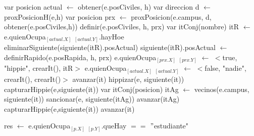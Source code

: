 \begin{algorithm}[H]
\begin{algorithmic}[1]
 
	\State var posicion actual $\gets$ obtener(e.posCiviles, h) 
	\State var direccion d $\gets$ proxPosicionH(e,h) 
	\State var posicion prx $\gets$ proxPosicion(e.campus, d, obtener(e.posCiviles,h)) 
	\State definir(e.posCiviles, h, prx) 
	\State var itConj(nombre) itR $\gets$ e.quienOcupa$_{[actual.X]}$ $_{[actual.Y]}$.hayHoe 
	\State eliminarSiguiente(siguiente(itR).posActual) 
	\State siguiente(itR).posActual $\gets$ definirRapido(e.posRapida, h, prx) 
	\State e.quienOcupa$_{[prx.X]}$ $_{[prx.Y]}$ $\gets$ $<$true, "hippie", crearIt(), itR$>$ 
	\State e.quienOcupa$_{[actual.X]}$ $_{[actual.Y]}$ $\gets$ $<$false, "nadie", crearIt(), crearIt()$>$ 
		 
			\State avanzar(it)	
		\Else
			 
				\State hippizar(e, siguiente(it)) 
							\State capturarHippie(e,siguiente(it)) 
						\EndIf
			\Else
				  
				 	\State var itConj(posicion) itAg $\gets$ vecinos(e.campus, siguiente(it)) 
				 			\State sancionar(e, siguiente(itAg))	
				 		\EndIf
				 		\State avanzar(itAg)	
				 	\EndWhile
				 \Else
				 	 
				 		\State capturarHippie(e,siguiente(it)) 
				 	\EndIf
				 \EndIf
			\EndIf
		\EndIf
		\State avanzar(it)	
	\EndWhile
\EndFunction
\end{algorithmic}
\end{algorithm}



\begin{algorithm}[H]
\begin{algorithmic}[1]
 
    \State res $\gets$ e.quienOcupa$_{[p.X]}$ $_{[p.Y]}$.queHay $==$ $"$estudiante"
\EndFunction
\end{algorithmic}
\end{algorithm}

